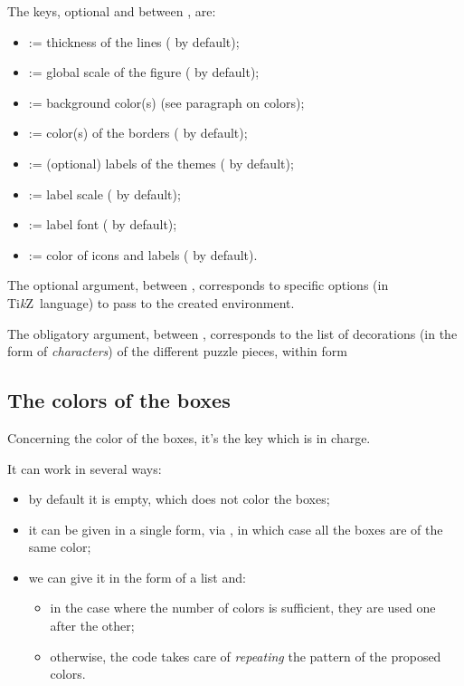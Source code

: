 \documentclass[11pt,a4paper]{ltxdoc}
\providecommand\tikzlogo{Ti\textit{k}Z}
\let\TikZ\tikzlogo
\begin{document}
The \textsf{keys}, optional and between \MontreCode{[...]}, are:

\begin{itemize}
	\item {}:= thickness of the lines (\MontreCode{1pt} by default);
	\item {}:= global scale of the figure ( by default);
	\item {}:= background color(s) (see paragraph on colors);
	\item {}:= color(s) of the borders ( by default);
	\item {}:= (optional) labels of the themes (\MontreCode{\{\}} by default);
	\item {}:= label scale ( by default);
	\item {}:= label font ( by default);
	\item {}:= color of icons and labels ( by default).
\end{itemize}

\medskip

The optional argument, between , corresponds to specific options (in \TikZ\ language) to pass to the created environment.

\smallskip

The obligatory argument, between , corresponds to the list of decorations (in the form of \textit{characters}) of the different puzzle pieces, within form 

\subsection{The colors of the boxes}

Concerning the color of the boxes, it's the key  which is in charge.

It can work in several ways:

\begin{itemize}
	\item by default it is empty, which does not color the boxes;
	\item it can be given in a single form, via , in which case all the boxes are of the same color;
	\item we can give it in the form of a list  and:
	\begin{itemize}
		\item in the case where the number of colors is sufficient, they are used one after the other;
		\item otherwise, the code takes care of \textit{repeating} the pattern of the proposed colors.
	\end{itemize}
\end{itemize}
\end{document}
